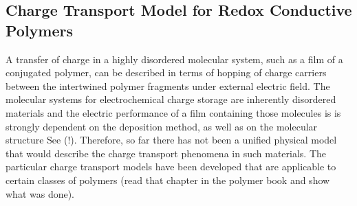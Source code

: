 \subsection{Charge Transport Model for Redox Conductive Polymers}
A transfer of charge in a highly disordered molecular system, such as a film of a conjugated polymer, can be described in terms of hopping of charge carriers between the intertwined polymer fragments under external electric field. The molecular systems for electrochemical charge storage are inherently disordered materials and the electric performance of a film containing those molecules is is strongly dependent on the deposition method, as well as on the molecular structure See \cite{Xie2021} (!). Therefore, so far there has not been a unified physical model that would describe the charge transport phenomena in such materials. The particular charge transport models have been developed that are applicable to certain classes of polymers (read that chapter in the polymer book and show what was done).

